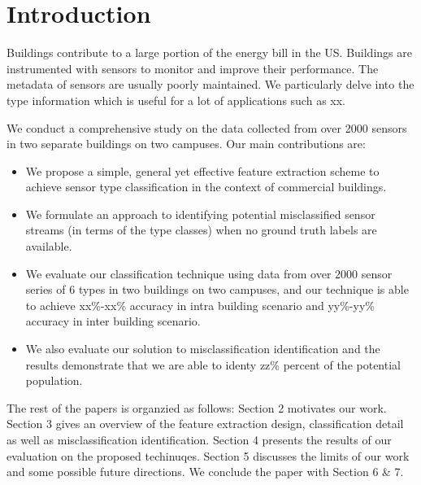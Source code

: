 \section{Introduction}
Buildings contribute to a large portion of the energy bill in the US.
Buildings are instrumented with sensors to monitor and improve their performance.
The metadata of sensors are usually poorly maintained. We particularly delve into the type information which is useful for a lot of applications such as xx.

We conduct a comprehensive study on the data collected from over 2000 sensors in two separate buildings on two campuses. Our main contributions are:

\begin{itemize}
\item We propose a simple, general yet effective feature extraction scheme to achieve sensor type classification in the context of commercial buildings.
\item We formulate an approach to identifying potential misclassified sensor streams (in terms of the type classes) when no ground truth labels are available.
\item We evaluate our classification technique using data from over 2000 sensor series of 6 types in two buildings on two campuses, and our technique is able to achieve xx\%-xx\% accuracy in intra building scenario and yy\%-yy\% accuracy in inter building scenario.
\item We also evaluate our solution to misclassification identification and the results demonstrate that we are able to identy zz\% percent of the potential population.
\end{itemize}

The rest of the papers is organzied as follows: Section 2 motivates our work. Section 3 gives an overview of the feature extraction design, classification detail as well as misclassification identification. Section 4 presents the results of our evaluation on the proposed techinuqes. Section 5 discusses the limits of our work and some possible future directions. We conclude the paper with Section 6 \& 7.